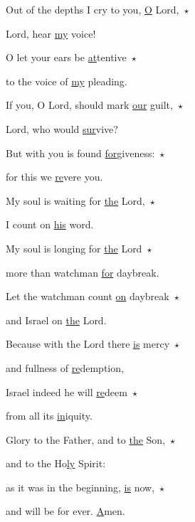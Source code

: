\noindent Out of the depths I cry to you, \uline{O} Lord,~$\star$~\nopagebreak

Lord, hear \uline{my} voice!

\noindent O let your ears be \uline{at}tentive~$\star$~\nopagebreak

to the voice of \uline{my} pleading.

\noindent If you, O Lord, should mark \uline{our} guilt,~$\star$~\nopagebreak

Lord, who would \uline{sur}vive?

\noindent But with you is found \uline{for}giveness:~$\star$~\nopagebreak

for this we \uline{re}vere you.

\noindent My soul is waiting for \uline{the} Lord,~$\star$~\nopagebreak

I count on \uline{his} word.

\noindent My soul is longing for \uline{the} Lord~$\star$~\nopagebreak

more than watchman \uline{for} daybreak.

\noindent Let the watchman count \uline{on} daybreak~$\star$~\nopagebreak

and Israel on \uline{the} Lord.

\noindent Because with the Lord there \uline{is} mercy~$\star$~\nopagebreak

and fullness of \uline{re}demption,

\noindent Israel indeed he will \uline{re}deem~$\star$~\nopagebreak

from all its \uline{in}iquity.

\noindent Glory to the Father, and to \uline{the} Son,~$\star$~\nopagebreak

and to the Ho\uline{ly} Spirit:

\noindent as it was in the beginning, \uline{is} now,~$\star$~\nopagebreak

and will be for ever. \uline{A}men.